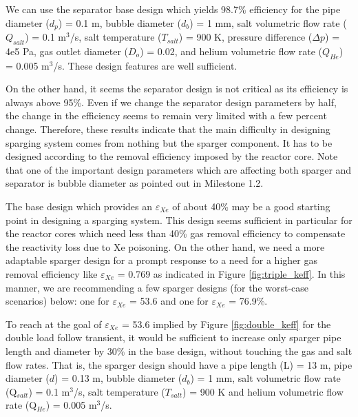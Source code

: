 \begin{itemize}
    We can use the separator base design which yields 98.7\% efficiency for the 
    pipe diameter ($d_p$) = 0.1 m, bubble diameter ($d_b$) = 1 mm, salt 
    volumetric flow rate ($Q_{salt}$) = 0.1 m$^{3}$/s, salt temperature 
    ($T_{salt}$) = 900 K, pressure difference ($\Delta p$) = 4e5 Pa, gas outlet 
    diameter ($D_o$) = 0.02, and helium volumetric flow rate ($Q_{He}$) = 0.005 
    m$^{3}$/s. These design features are well sufficient.

    On the other hand, it seems the separator design is not critical as its 
    efficiency is always above 95\%. Even if we change the separator design 
    parameters by half, the change in the efficiency seems to remain very 
    limited with a few percent change. Therefore, these results indicate that 
    the main difficulty in designing sparging system comes from nothing but the 
    sparger component. It has to be designed according to the removal 
    efficiency imposed by the reactor core. Note that one of the important 
    design parameters which are affecting both sparger and separator is bubble 
    diameter as pointed out in Milestone 1.2.

    The base design which provides an $\varepsilon$$_{Xe}$ of about 40\% may be 
    a good starting point in designing a sparging system. This design seems 
    sufficient in particular for the reactor cores which need less than 40\% 
    gas removal efficiency to compensate the reactivity loss due to Xe 
    poisoning. On the other hand, we need a more adaptable sparger design for a 
    prompt response to a need for a higher gas removal efficiency like 
    $\varepsilon$$_{Xe}$ = 0.769 as indicated in Figure \ref{fig:triple_keff}. 
    In this manner, we are recommending a few sparger designs (for the 
    worst-case scenarios) below: one for $\varepsilon$$_{Xe}$ = 53.6 and one 
    for $\varepsilon$$_{Xe}$ = 76.9\%.

    To reach at the goal of $\varepsilon$$_{Xe}$ = 53.6 implied by Figure 
    \ref{fig:double_keff} for the double load follow transient, it would be 
    sufficient to increase only sparger pipe length and diameter by 30\% in the 
    base design, without touching the gas and salt flow rates. That is, the 
    sparger design should have a pipe length (L) = 13 m, pipe diameter ($d$) = 
    0.13 m, bubble diameter ($d_b$) = 1 mm, salt volumetric flow rate 
    (Q$_{salt}$) = 0.1 m$^{3}$/s, salt temperature ($T_{salt}$) = 900 K and 
    helium volumetric flow rate (Q$_{He}$) = 0.005 m$^{3}$/s.


\end{itemize}
